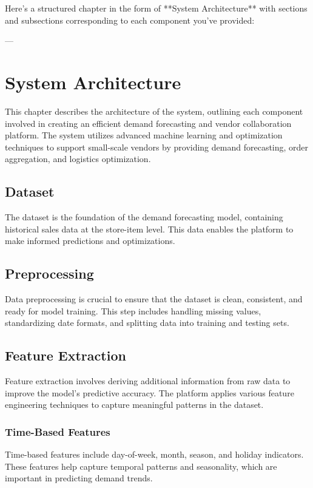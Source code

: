 Here's a structured chapter in the form of **System Architecture** with sections and subsections corresponding to each component you've provided:

---

\chapter{System Architecture}

This chapter describes the architecture of the system, outlining each component involved in creating an efficient demand forecasting and vendor collaboration platform. The system utilizes advanced machine learning and optimization techniques to support small-scale vendors by providing demand forecasting, order aggregation, and logistics optimization.

\section{Dataset}

The dataset is the foundation of the demand forecasting model, containing historical sales data at the store-item level. This data enables the platform to make informed predictions and optimizations.

\section{Preprocessing}

Data preprocessing is crucial to ensure that the dataset is clean, consistent, and ready for model training. This step includes handling missing values, standardizing date formats, and splitting data into training and testing sets.

\section{Feature Extraction}

Feature extraction involves deriving additional information from raw data to improve the model’s predictive accuracy. The platform applies various feature engineering techniques to capture meaningful patterns in the dataset.

\subsection{Time-Based Features}

Time-based features include day-of-week, month, season, and holiday indicators. These features help capture temporal patterns and seasonality, which are important in predicting demand trends.

